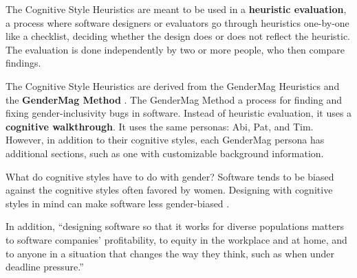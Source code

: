 



The Cognitive Style Heuristics are meant to be used in a \textbf{heuristic evaluation}, a process where software designers or evaluators go through heuristics one-by-one like a checklist, deciding whether the design does or does not reflect the heuristic. The evaluation is done independently by two or more people, who then compare findings.

The Cognitive Style Heuristics are derived from the GenderMag Heuristics \parencite{gendermagheuristics} and the \textbf{GenderMag Method} \parencite{burnett16}. The GenderMag Method a process for finding and fixing gender-inclusivity bugs in software. Instead of heuristic evaluation, it uses a \textbf{cognitive walkthrough}. It uses the same personas: Abi, Pat, and Tim. However, in addition to their cognitive styles, each GenderMag persona has additional sections, such as one with customizable background information.

What do cognitive styles have to do with gender? Software tends to be biased against the cognitive styles often favored by women. Designing with cognitive styles in mind can make software less gender-biased \parencite{vorvoreanu19}.

In addition, ``designing software so that it works for diverse populations matters to software companies’ profitability, to equity in the workplace and at home, and to anyone in a situation that changes the way they think, such as when under deadline pressure.''\parencite{mendez19}

